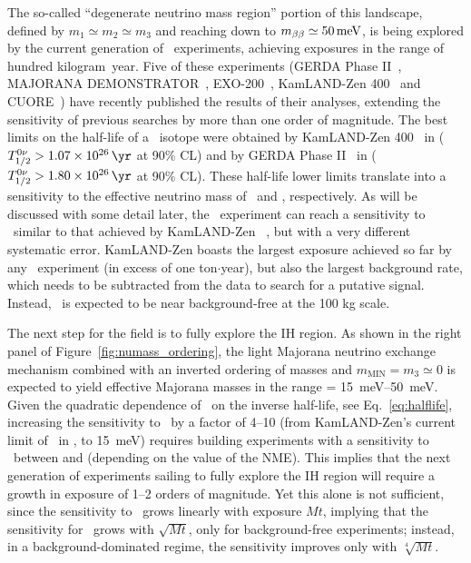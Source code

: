 The so-called ``degenerate neutrino mass region'' portion of this landscape, defined by $m_1\simeq m_2\simeq m_3$ and reaching down to $\mbb \simeq \SI{50}{\meV}$, is being explored by the current generation of \bbonu\ experiments, achieving exposures in the range of hundred kilogram~year. Five of these experiments (GERDA Phase II~\cite{GERDA:2020xhi}, MAJORANA DEMONSTRATOR~\cite{Majorana:2019nbd}, EXO-200~\cite{EXO-200:2019rkq}, KamLAND-Zen 400~\cite{KamLAND-Zen:2016pfg} and CUORE~\cite{CUORE:2021gpk}) have recently published the results of their analyses, extending the sensitivity of previous searches by more than one order of magnitude.  The best limits on the half-life of a \bbonu\ isotope were obtained by KamLAND-Zen 400~\cite{KamLAND-Zen:2016pfg} in  ($\Tonu > \KZenTz$ at 90\% CL) and by GERDA Phase II~\cite{GERDA:2020xhi} in  ($\Tonu > \GerdaTz$ at 90\% CL). These half-life lower limits translate into a sensitivity to the effective neutrino mass of \KZenMbb\ and \GerdaMbb, respectively. 
As will be discussed with some detail later, 
the \Next\ experiment can reach a sensitivity to \Tonu\ similar to that achieved by  KamLAND-Zen ~\cite{Martin-Albo:2015rhw}, but with a very different systematic error. KamLAND-Zen boasts the largest exposure achieved so far by any \bbonu\ experiment (in excess of one ton$\cdot$year), but also the largest background rate, which needs to be subtracted from the data to search for a putative signal. Instead, \Next\ is expected to be near background-free at the 100 kg scale.
 
The next step for the field is to fully explore the IH region. As shown in the right panel of Figure~\ref{fig:numass_ordering}, the light Majorana neutrino exchange mechanism combined with an inverted ordering of masses and $m_\mathrm{MIN}=m_3\simeq 0$ is expected to yield effective Majorana masses in the range \mbb = \SIrange{15}{50}{\meV}. Given the quadratic dependence of \mbb\ on the inverse half-life, see Eq.~\ref{eq:halflife}, increasing the sensitivity to \mbb\ by a factor of 4--10 (from KamLAND-Zen's current limit of \KZenMbb\ in , to \SI{15}{\meV}) requires building experiments with a sensitivity to \Tonu\ between \IHTzl \; and  \IHTz \;  (depending on the value of the NME). This implies that the next generation of experiments sailing to fully explore the IH region will require a growth in exposure of 1--2 orders of magnitude.  Yet this alone is not sufficient, since the sensitivity to \Tonu\ grows linearly with exposure $Mt$, implying that the sensitivity for \mbb\ grows with $\sqrt{Mt}$, only for background-free experiments; instead, in a background-dominated regime, the sensitivity improves only with $\sqrt[4]{Mt}$.

